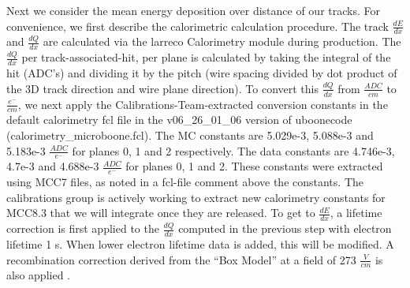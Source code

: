 \documentclass{article}
\begin{document}
\par  Next we consider the mean energy deposition over distance of our tracks.  For convenience, we first describe the calorimetric calculation procedure. The track $\frac{dE}{dx}$ and $\frac{dQ}{dx}$ are calculated via the larreco Calorimetry module during production.  The $\frac{dQ}{dx}$ per track-associated-hit, per plane is calculated by taking the integral of the hit (ADC's) and dividing it by the pitch (wire spacing divided by dot product of the 3D track direction and wire plane direction). To convert this $\frac{dQ}{dx}$ from $\frac{ADC}{cm}$ to $\frac{e^-}{cm}$, we next apply the Calibrations-Team-extracted conversion constants in the default calorimetry fcl file in the v06\_26\_01\_06 version of uboonecode (calorimetry\_microboone.fcl). The MC constants are 5.029e-3, 5.088e-3 and 5.183e-3 $\frac{ADC}{e^-}$ for planes 0, 1 and 2 respectively.  The data constants are 4.746e-3, 4.7e-3 and 4.688e-3 $\frac{ADC}{e^-}$ for planes 0, 1 and 2.  These constants were extracted using MCC7 files, as noted in a fcl-file comment above the constants.  The calibrations group is actively working to extract new calorimetry constants for MCC8.3 that we will integrate once they are released. 
To get to $\frac{dE}{dx}$, a lifetime correction is first applied to the $\frac{dQ}{dx}$ computed in the previous step with electron lifetime 1 s. When lower electron lifetime data is added, this will be modified.  A recombination correction derived from the ``Box Model'' at a field of 273 $\frac{V}{cm}$ is also applied \cite{bib:argoneut_recomb}. %
\end{document}
